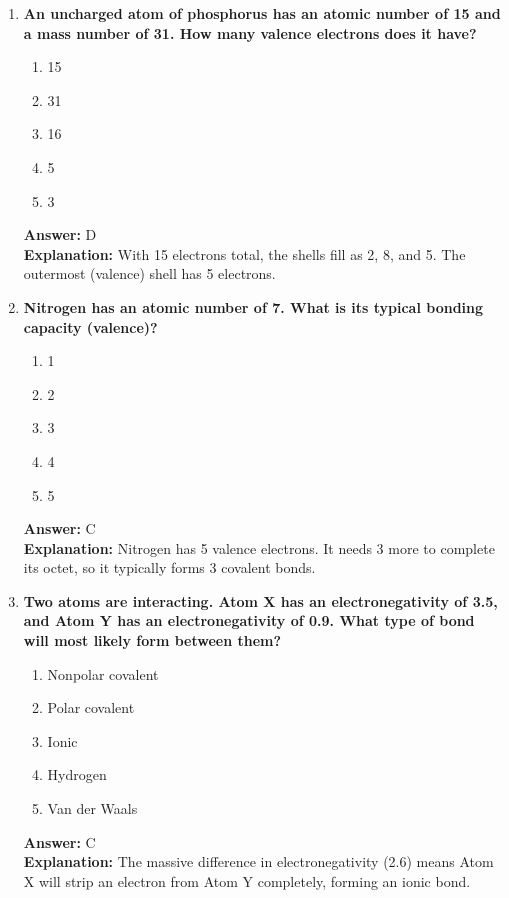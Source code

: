 \documentclass[11pt, a4paper]{article}
\begin{document}
\begin{enumerate}

\item \textbf{An uncharged atom of phosphorus has an atomic number of 15 and a mass number of 31. How many valence electrons does it have?}
\begin{enumerate}[label=\Alph*.]
    \item 15
    \item 31
    \item 16
    \item 5
    \item 3
\end{enumerate}
\textbf{Answer:} D \\
\textbf{Explanation:} With 15 electrons total, the shells fill as 2, 8, and 5. The outermost (valence) shell has 5 electrons.

\item \textbf{Nitrogen has an atomic number of 7. What is its typical bonding capacity (valence)?}
\begin{enumerate}[label=\Alph*.]
    \item 1
    \item 2
    \item 3
    \item 4
    \item 5
\end{enumerate}
\textbf{Answer:} C \\
\textbf{Explanation:} Nitrogen has 5 valence electrons. It needs 3 more to complete its octet, so it typically forms 3 covalent bonds.

\item \textbf{Two atoms are interacting. Atom X has an electronegativity of 3.5, and Atom Y has an electronegativity of 0.9. What type of bond will most likely form between them?}
\begin{enumerate}[label=\Alph*.]
    \item Nonpolar covalent
    \item Polar covalent
    \item Ionic
    \item Hydrogen
    \item Van der Waals
\end{enumerate}
\textbf{Answer:} C \\
\textbf{Explanation:} The massive difference in electronegativity (2.6) means Atom X will strip an electron from Atom Y completely, forming an ionic bond.


\end{enumerate}
\end{document}
